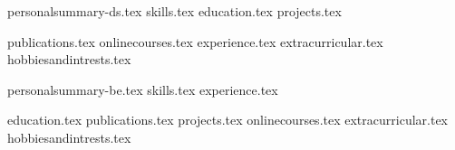 \documentclass[12pt, a4paper]{awesome-cv}
\newcommand*{\sectiondir}{resume/}
\newcounter{ds_or_be}
\begin{document}
\makecvheader

{
{personalsummary-ds.tex}
{skills.tex}
{education.tex}
{projects.tex}
\pagebreak

{publications.tex}
{onlinecourses.tex}
{experience.tex}
{extracurricular.tex}
{hobbiesandintrests.tex}
}
{
{personalsummary-be.tex}
{skills.tex}
{experience.tex}
\pagebreak

{education.tex}
{publications.tex}
{projects.tex}
{onlinecourses.tex}
{extracurricular.tex}
{hobbiesandintrests.tex}

}
\end{document}
